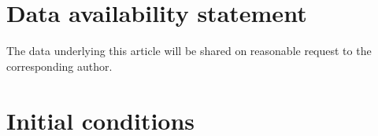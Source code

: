 \documentclass[letters,a4paper,fleqn,usenatbib]{mnras}
\begin{document}
\section*{Data availability statement}
 	
The data underlying this article will be shared on reasonable request to the corresponding author.









\appendix

\section{Initial conditions} \label{appendix:IC}
\end{document}
